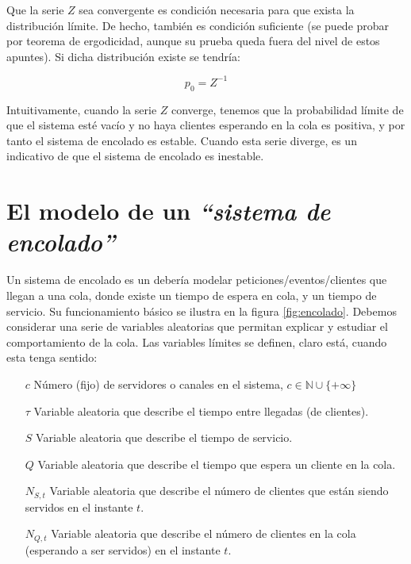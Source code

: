 \documentclass[a4paper,10pt]{scrartcl}
\theoremstyle{definition}
\numberwithin{equation}{section}
\begin{document}
Que la serie $Z$ sea convergente es condición necesaria para que exista la distribución límite. 
De hecho, también es condición suficiente (se puede probar por teorema de ergodicidad, aunque su prueba queda
fuera del nivel de estos apuntes). Si dicha distribución existe se tendría: 

\begin{equation}
 p_0 = Z^{-1} 
 \label{eq:relp0}
\end{equation}

Intuitivamente, cuando la serie $Z$ converge, tenemos que la probabilidad límite de que el 
sistema esté vacío y no haya clientes esperando en la cola es positiva, y por tanto el sistema 
de encolado es estable. Cuando esta serie diverge, es un indicativo de que el sistema de encolado
es inestable.


\section{El modelo de un \textit{``sistema de encolado''}}
Un sistema de encolado es un debería modelar peticiones/eventos/clientes que llegan a una cola,
donde existe un tiempo de espera en cola, y un tiempo de servicio. Su funcionamiento básico se 
ilustra en la figura \ref{fig:encolado}. Debemos considerar una serie de variables aleatorias que permitan
explicar y estudiar el comportamiento de la cola. Las variables límites se definen, claro está, cuando esta 
tenga sentido:

\begin{itemize}
\item [$c$]
  Número (fijo) de servidores o canales en el sistema, $c\in \mathbb{N} \cup \{+\infty\}$
\item [$\tau$]
  Variable aleatoria que describe el tiempo entre llegadas (de clientes).
\item [$S$]
  Variable aleatoria que describe el tiempo de servicio.
\item [$Q$]
  Variable aleatoria que describe el tiempo que espera un cliente en la cola.
\item [$N_{S,t}$]
  Variable aleatoria que describe el número de clientes que están siendo servidos en el instante $t$.
\item [$N_{Q,t}$]
  Variable aleatoria que describe el número de clientes en la cola (esperando a ser servidos) en el instante $t$.
\end{itemize}
\end{document}
